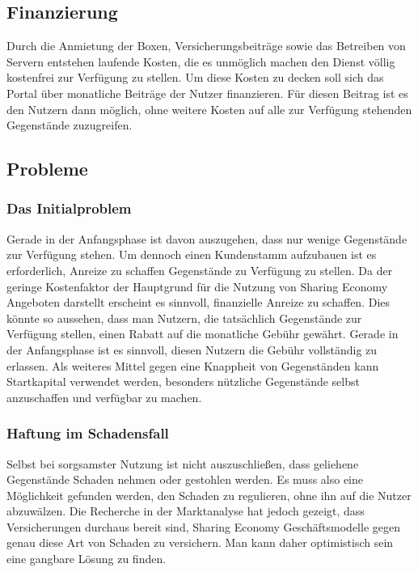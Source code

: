 \documentclass[a4paper]{scrartcl}
\begin{document}
\begin{multicols}{2}
		
		
		\subsection{Finanzierung}
			Durch die Anmietung der Boxen, Versicherungsbeitr\"age sowie das Betreiben von Servern entstehen laufende Kosten, die es unm\"oglich machen den Dienst v\"ollig kostenfrei zur Verf\"ugung zu stellen. Um diese Kosten zu decken soll sich das Portal \"uber monatliche Beitr\"age der Nutzer finanzieren. F\"ur diesen Beitrag ist es den Nutzern dann m\"oglich, ohne weitere Kosten auf alle zur Verf\"ugung stehenden Gegenst\"ande zuzugreifen.
		
		
		\subsection{Probleme}
		
			\subsubsection{Das Initialproblem}
				Gerade in der Anfangsphase ist davon auszugehen, dass nur wenige Gegenst\"ande zur Verf\"ugung stehen. Um  dennoch einen Kundenstamm aufzubauen ist es erforderlich, Anreize zu schaffen Gegenst\"ande zu Verf\"ugung zu stellen. Da der geringe Kostenfaktor der Hauptgrund f\"ur die Nutzung von Sharing Economy Angeboten darstellt erscheint es sinnvoll, finanzielle Anreize zu schaffen. Dies k\"onnte so aussehen, dass man Nutzern, die tats\"achlich Gegenst\"ande zur Verf\"ugung stellen, einen Rabatt auf die monatliche Geb\"uhr gew\"ahrt. Gerade in der Anfangsphase ist es sinnvoll, diesen Nutzern die Geb\"uhr vollst\"andig zu erlassen. Als weiteres Mittel gegen eine Knappheit von Gegenst\"anden kann Startkapital verwendet werden, besonders n\"utzliche Gegenst\"ande selbst anzuschaffen und verf\"ugbar zu machen.
			
			
			\subsubsection{Haftung im Schadensfall}
				Selbst bei sorgsamster Nutzung ist nicht auszuschlie\ss en, dass geliehene Gegenst\"ande Schaden nehmen oder gestohlen werden. Es muss also eine M\"oglichkeit gefunden werden, den Schaden zu regulieren, ohne ihn auf die Nutzer abzuw\"alzen. Die Recherche in der Marktanalyse hat jedoch gezeigt, dass Versicherungen durchaus bereit sind, Sharing Economy Gesch\"aftsmodelle gegen genau diese Art von Schaden zu versichern. Man kann daher optimistisch sein eine gangbare L\"osung zu finden.
				

\end{multicols}
\end{document}
